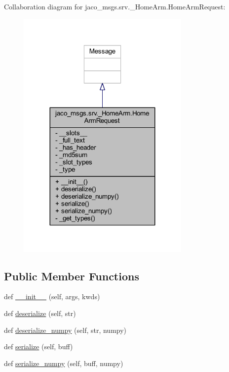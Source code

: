 Collaboration diagram for jaco\+\_\+msgs.\+srv.\+\_\+\+Home\+Arm.\+Home\+Arm\+Request\+:
\nopagebreak
\begin{figure}[H]
\begin{center}
\leavevmode
\includegraphics[width=239pt]{d2/d16/classjaco__msgs_1_1srv_1_1__HomeArm_1_1HomeArmRequest__coll__graph}
\end{center}
\end{figure}
\subsection*{Public Member Functions}
\begin{DoxyCompactItemize}
\item 
def \hyperlink{classjaco__msgs_1_1srv_1_1__HomeArm_1_1HomeArmRequest_a5e3429321f08ce808c3dec34a0bc31c9}{\+\_\+\+\_\+init\+\_\+\+\_\+} (self, args, kwds)
\item 
def \hyperlink{classjaco__msgs_1_1srv_1_1__HomeArm_1_1HomeArmRequest_a858a49cf67aec1d1d0d4973c3dfe5f11}{deserialize} (self, str)
\item 
def \hyperlink{classjaco__msgs_1_1srv_1_1__HomeArm_1_1HomeArmRequest_adb45ff2284b895b00edbaecb77151d87}{deserialize\+\_\+numpy} (self, str, numpy)
\item 
def \hyperlink{classjaco__msgs_1_1srv_1_1__HomeArm_1_1HomeArmRequest_ac5923fc5e417e78755c72e99a9db255c}{serialize} (self, buff)
\item 
def \hyperlink{classjaco__msgs_1_1srv_1_1__HomeArm_1_1HomeArmRequest_ab9b60f5ab93b3422b42760af66291535}{serialize\+\_\+numpy} (self, buff, numpy)
\end{DoxyCompactItemize}
